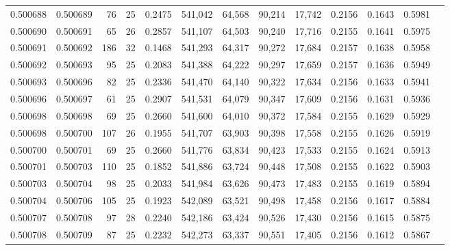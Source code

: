 \begin{tabular}{rrrrrrrrrrrrr}
0.500688 & 0.500689 &  76 &  25 &                                     0.2475 & 541,042 &  64,568 &  90,214 &  17,742 & 0.2156 & 0.1643 & 0.5981 \\
0.500690 & 0.500691 &  65 &  26 &                                     0.2857 & 541,107 &  64,503 &  90,240 &  17,716 & 0.2155 & 0.1641 & 0.5975 \\
0.500691 & 0.500692 & 186 &  32 &                                     0.1468 & 541,293 &  64,317 &  90,272 &  17,684 & 0.2157 & 0.1638 & 0.5958 \\
0.500692 & 0.500693 &  95 &  25 &                                     0.2083 & 541,388 &  64,222 &  90,297 &  17,659 & 0.2157 & 0.1636 & 0.5949 \\
0.500693 & 0.500696 &  82 &  25 &                                     0.2336 & 541,470 &  64,140 &  90,322 &  17,634 & 0.2156 & 0.1633 & 0.5941 \\
0.500696 & 0.500697 &  61 &  25 &                                     0.2907 & 541,531 &  64,079 &  90,347 &  17,609 & 0.2156 & 0.1631 & 0.5936 \\
0.500698 & 0.500698 &  69 &  25 &                                     0.2660 & 541,600 &  64,010 &  90,372 &  17,584 & 0.2155 & 0.1629 & 0.5929 \\
0.500698 & 0.500700 & 107 &  26 &                                     0.1955 & 541,707 &  63,903 &  90,398 &  17,558 & 0.2155 & 0.1626 & 0.5919 \\
0.500700 & 0.500701 &  69 &  25 &                                     0.2660 & 541,776 &  63,834 &  90,423 &  17,533 & 0.2155 & 0.1624 & 0.5913 \\
0.500701 & 0.500703 & 110 &  25 &                                     0.1852 & 541,886 &  63,724 &  90,448 &  17,508 & 0.2155 & 0.1622 & 0.5903 \\
0.500703 & 0.500704 &  98 &  25 &                                     0.2033 & 541,984 &  63,626 &  90,473 &  17,483 & 0.2155 & 0.1619 & 0.5894 \\
0.500704 & 0.500706 & 105 &  25 &                                     0.1923 & 542,089 &  63,521 &  90,498 &  17,458 & 0.2156 & 0.1617 & 0.5884 \\
0.500707 & 0.500708 &  97 &  28 &                                     0.2240 & 542,186 &  63,424 &  90,526 &  17,430 & 0.2156 & 0.1615 & 0.5875 \\
0.500708 & 0.500709 &  87 &  25 &                                     0.2232 & 542,273 &  63,337 &  90,551 &  17,405 & 0.2156 & 0.1612 & 0.5867 \\

\end{tabular}
